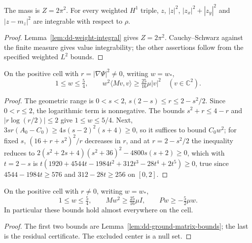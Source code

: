 \begin{lemma}
\label{lem:dd-weighted-integrals}
\leanok
The mass is $Z=2\pi^2$. For every weighted $H^1$ triple, $z$, $|z|^2$,
$|z_x|^2+|z_y|^2$ and $|z-m_z|^2$ are integrable with respect to $\rho$.
\end{lemma}

\begin{proof}
\leanok
Lemma~\ref{lem:dd-weight-integral} gives $Z=2\pi^2$.
Cauchy--Schwarz against the
finite measure gives value integrability; the other assertions follow
from the specified weighted $L^2$ bounds.
\end{proof}

\begin{lemma}
\label{lem:dd-ground-matrix-bounds}
\leanok
On the positive cell with $r=|\nabla\Psi|^2\ne0$, writing $w=w_*$,
\[
  1\le w\le\tfrac54,\qquad
  w^2\langle Mv,v\rangle\ge\tfrac{25}{16}\mu|v|^2
  \quad(v\in\mathbb C^2).
\]
\end{lemma}

\begin{proof}
\leanok
The geometric range is $0<s<2$, $s(2-s)\le r\le2-s^2/2$. Since $0<r\le2$, the
logarithmic term is nonnegative. The bounds $s^2+r\le4-r$ and
$|r\log(r/2)|\le2$ give $1\le w\le5/4$. Next, $3sr(A_0-C_0)\ge4s(s-2)^2(s+4)\ge0$, so it suffices to bound
$C_0w^2$; for fixed $s$, $(16+r+s^2)^2/r$ decreases in $r$, and at
$r=2-s^2/2$ the inequality reduces to
$2(s^2+2s+4)(s^2+36)^2-4800s(s+2)\ge0$, which with $t=2-s$ is
$t(1920+4544t-1984t^2+312t^3-28t^4+2t^5)\ge0$, true since
$4544-1984t\ge576$ and $312-28t\ge256$ on $[0,2]$.
\end{proof}

\begin{lemma}
\label{lem:dd-bulk-coefficients}
\leanok
On the positive cell with $r\ne0$, writing $w=w_*$,
\[
  1\le w\le\tfrac54,\qquad Mw^2\ge\tfrac{25}{16}\mu I,\qquad Pw\ge-\tfrac52\mu w.
\]
In particular these bounds hold almost everywhere on the cell.
\end{lemma}

\begin{proof}
\leanok
The first two bounds are Lemma~\ref{lem:dd-ground-matrix-bounds};
the last is the residual certificate. The excluded center is a null set.
\end{proof}

